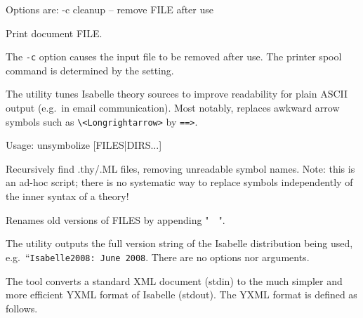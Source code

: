 \begin{isabellebody}
\begin{isamarkuptext}
\begin{ttbox}
  Options are:
    -c           cleanup -- remove FILE after use

  Print document FILE.
\end{ttbox}

  The \verb|-c| option causes the input file to be removed
  after use.  The printer spool command is determined by the \hyperlink{setting.PRINT-COMMAND}{\mbox{}} setting.%
\end{isamarkuptext}%
\isamarkuptrue%
%
\isamarkuptrue%
%
\begin{isamarkuptext}%
The \hypertarget{tool.unsymbolize}{\hyperlink{tool.unsymbolize}{\mbox{}}} utility tunes Isabelle theory sources to
  improve readability for plain ASCII output (e.g.\ in email
  communication).  Most notably, \hyperlink{tool.unsymbolize}{\mbox{}} replaces awkward
  arrow symbols such as \verb|\|\verb|<Longrightarrow>|
  by \verb|==>|.
\begin{ttbox}
Usage: unsymbolize [FILES|DIRS...]

  Recursively find .thy/.ML files, removing unreadable symbol names.
  Note: this is an ad-hoc script; there is no systematic way to replace
  symbols independently of the inner syntax of a theory!

  Renames old versions of FILES by appending "~~".
\end{ttbox}%
\end{isamarkuptext}%
\isamarkuptrue%
%
\isamarkuptrue%
%
\begin{isamarkuptext}%
The \hypertarget{tool.version}{\hyperlink{tool.version}{\mbox{}}} utility outputs the full version string of
  the Isabelle distribution being used, e.g.\ ``\verb|Isabelle2008: June 2008|.  There are no options nor arguments.%
\end{isamarkuptext}%
\isamarkuptrue%
%
\isamarkuptrue%
%
\begin{isamarkuptext}%
The \hypertarget{tool.yxml}{\hyperlink{tool.yxml}{\mbox{}}} tool converts a standard XML document (stdin)
  to the much simpler and more efficient YXML format of Isabelle
  (stdout).  The YXML format is defined as follows.

  \begin{enumerate}


\end{enumerate}
\end{isamarkuptext}
\end{isabellebody}
